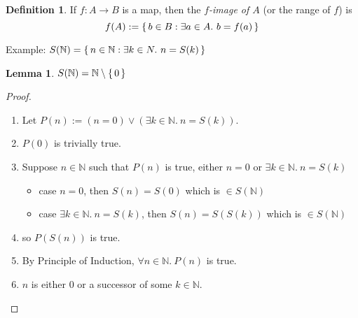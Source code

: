 \documentclass[12pt]{article}
\newenvironment{prf}
{
    \begin{proof}
        \hfill
        \begin{enumerate}[label*=\arabic*.]
                }
                {
                \hfill\qedsymbol
        \end{enumerate}
    \renewcommand{\qedsymbol}{}
    \end{proof}
}
\newcounter{dummy} \numberwithin{dummy}{section}
\newtheorem{lemma}[dummy]{Lemma}
\theoremstyle{definition}
\newtheorem{defn}[dummy]{Definition}
\newcommand{\nat}{\mathbb{N}}
\begin{document}
\begin{defn}
    If $f:A\to B$ is a map, then the \emph{$f$-image of $A$} (or the range of $f$) is
    $$f(A) := \set{b \in B : \exists a \in A.~ b = f(a)}$$
\end{defn}
Example: $S(\nat) = \set{n \in \nat : \exists k \in N.~ n = S(k)}$
\begin{lemma}
    $S(\nat) = \nat\setminus \set{0}$
\end{lemma}
\begin{prf}
\item Let $P(n) := (n=0) \lor (\exists k \in \nat.~ n = S(k))$.
\item $P(0)$ is trivially true.
\item Suppose $n \in \nat$ such that $P(n)$ is true, either $n=0$ or $\exists k \in \nat.~ n = S(k)$
    \begin{itemize}
        \item case $n=0$, then $S(n) = S(0)$ which is $\in S(\nat)$
        \item case $\exists k \in \nat.~ n = S(k)$, then
            $S(n) = S(S(k))$ which is $\in S(\nat)$
    \end{itemize}
\item so $P(S(n))$ is true.
\item By Principle of Induction, $\forall n \in \nat.~ P(n)$ is true.
\item[] $n$ is either $0$ or a successor of some $k \in \nat$.
\end{prf}
\end{document}
